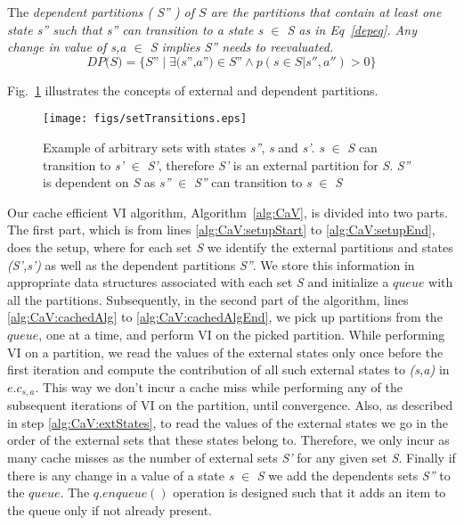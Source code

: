 \documentclass[conference]{IEEEtran}
\begin{document}
The \em{dependent partitions} ( \textit{S''} ) of $S$ are the partitions that contain at least one state \textit{s''} such that \textit{s''} can transition to a state \textit{s} $\in$ \textit{S} as in Eq~\ref{depeq}. Any change in value of \textit{s,a} $\in$ \textit{S} implies \textit{S''} needs to reevaluated.
\begin{equation}
\textit{DP(S)} = \{\textit{S''} \mid \exists \textit{(s'',a'')} \in \textit{S''} \land p(s \in \textit{S}|s'',a'') > 0\} \label{depeq}
\end{equation}

Fig.~\ref{fig} illustrates the concepts of external and dependent partitions.

\begin{figure}[htbp]
\centerline{\texttt{[image: figs/setTransitions.eps]}}
\caption{Example of arbitrary sets with states \textit{s''}, \textit{s} and \textit{s'}. \textit{s} $\in$ \textit{S} can transition to \textit{s'} $\in$ \textit{S'}, therefore \textit{S'} is an external partition for \textit{S}. \textit{S''} is dependent on \textit{S} as \textit{s''} $\in$ \textit{S''} can transition to \textit{s} $\in$ \textit{S}}
\label{fig}
\end{figure}

Our cache efficient VI algorithm, Algorithm~\ref{alg:CaV}, is divided into two parts. The first part, which is from lines \ref{alg:CaV:setupStart} to \ref{alg:CaV:setupEnd}, does the setup, where for each set \textit{S} we identify the external partitions and states \textit{(S',s')} as well as the
dependent partitions \textit{S''}. We store this information in appropriate data structures associated with each set \textit{S} and initialize a $queue$ with all the partitions.  Subsequently, in the second part of the algorithm,
lines \ref{alg:CaV:cachedAlg} to \ref{alg:CaV:cachedAlgEnd}, we pick up partitions from the $queue$, one at a time, and perform VI on the picked partition. While performing VI on a partition, we read the values of the external states only once before the first iteration and compute the contribution of all such external states to \textit{(s,a)} in \textit{$e.c_{s,a}$}. This way we don't incur a cache miss while performing any of the subsequent iterations of VI on the partition, until convergence. Also, as described in step \ref{alg:CaV:extStates}, to read the values of the external states we go in the order of the external sets that these states belong to. Therefore, we only incur as many cache misses as the number of external sets \textit{S'} for any given set \textit{S}. Finally if there is any change in a value of a state \textit{s} $\in$ \textit{S} we add the dependents sets \textit{S''} to the $queue$. The $q.enqueue()$ operation is designed such that it adds an item to the queue only if not already present.
\end{document}
